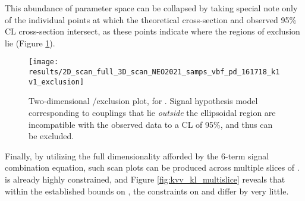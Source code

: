     \FloatBarrier
    This abundance of parameter space can be collapsed by taking special note only of
        the individual points at which the theoretical cross-section and observed 95\% CL cross-section intersect,
        as these points indicate where the regions of exclusion lie (Figure \ref{fig:kvv_kl_2Dscan}).

    \begin{figure}
        \texttt{[image: results/2D\_scan\_full\_3D\_scan\_NEO2021\_samps\_vbf\_pd\_161718\_k1v1\_exclusion]}
        \caption{Two-dimensional \kvv/\kl exclusion plot, for .
            Signal hypothesis model corresponding to couplings that lie
                \textit{outside} the ellipsoidal region are incompatible with the observed data to a CL of 95\%,
                and thus can be excluded.
            }
        \label{fig:kvv_kl_2Dscan}
    \end{figure}

    Finally, by utilizing the full dimensionality afforded by the 6-term signal combination equation,
        such scan plots can be produced across multiple slices of \kv.
    \kv is already highly constrained, and Figure \ref{fig:kvv_kl_multislice}
        reveals that within the established bounds on \kv,
        the constraints on \kl and \kvv differ by very little.

